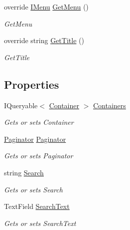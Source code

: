 \begin{DoxyCompactItemize}
override \mbox{\hyperlink{interface_gtd_app_1_1_console_core_1_1_menu_1_1_i_menu}{I\+Menu}} \mbox{\hyperlink{class_gtd_app_1_1_console_1_1_views_1_1_containers_1_1_list_containers_view_a25bfb63f79fb2b356450cf5bb59e1772}{Get\+Menu}} ()
\begin{DoxyCompactList}\small\item\em Get\+Menu \end{DoxyCompactList}\item 
override string \mbox{\hyperlink{class_gtd_app_1_1_console_1_1_views_1_1_containers_1_1_list_containers_view_a27b68fb8c16a49dbd3b85942851208b9}{Get\+Title}} ()
\begin{DoxyCompactList}\small\item\em Get\+Title \end{DoxyCompactList}\end{DoxyCompactItemize}
\subsection*{Properties}
\begin{DoxyCompactItemize}
\item 
I\+Queryable$<$ \mbox{\hyperlink{class_gtd_app_1_1_data_1_1_container}{Container}} $>$ \mbox{\hyperlink{class_gtd_app_1_1_console_1_1_views_1_1_containers_1_1_list_containers_view_a6b640718630104f856d057b37baf0e3d}{Containers}}
\begin{DoxyCompactList}\small\item\em Gets or sets Container \end{DoxyCompactList}\item 
\mbox{\hyperlink{class_gtd_app_1_1_repository_1_1_paginator}{Paginator}} \mbox{\hyperlink{class_gtd_app_1_1_console_1_1_views_1_1_containers_1_1_list_containers_view_adcd55fba16e0e947a48437352422fb6e}{Paginator}}
\begin{DoxyCompactList}\small\item\em Gets or sets Paginator \end{DoxyCompactList}\item 
string \mbox{\hyperlink{class_gtd_app_1_1_console_1_1_views_1_1_containers_1_1_list_containers_view_aab3835e72523a09ada93a78f948b292b}{Search}}
\begin{DoxyCompactList}\small\item\em Gets or sets Search \end{DoxyCompactList}\item 
Text\+Field \mbox{\hyperlink{class_gtd_app_1_1_console_1_1_views_1_1_containers_1_1_list_containers_view_ad82510d568d798ea110065a02e196f8f}{Search\+Text}}
\begin{DoxyCompactList}\small\item\em Gets or sets Search\+Text \end{DoxyCompactList}\end{DoxyCompactItemize}
